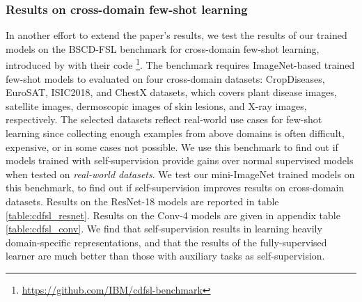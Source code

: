 


\subsubsection{Results on cross-domain few-shot learning}

In another effort to extend the paper's results, we test the results of our trained models on the BSCD-FSL benchmark for cross-domain few-shot learning, introduced by \cite{guo2020broader} with their code \footnote[7]{\url{https://github.com/IBM/cdfsl-benchmark}}. The benchmark requires ImageNet-based trained few-shot models to evaluated on four cross-domain datasets: CropDiseases, EuroSAT, ISIC2018, and ChestX datasets, which covers plant disease images, satellite images, dermoscopic images of skin lesions, and X-ray images, respectively. The selected datasets reflect real-world use cases for few-shot learning since collecting enough examples from above domains is often difficult, expensive, or in some cases not possible. We use this benchmark to find out if models trained with self-supervision provide gains over normal supervised models when tested  on \textit{real-world datasets}. We test our mini-ImageNet trained models on this benchmark, to find out if self-supervision improves results on cross-domain datasets. Results on the ResNet-18 models are reported in table \ref{table:cdfsl_resnet}. Results on the Conv-4 models are given in appendix table \ref{table:cdfsl_conv}. 
We find that self-supervision results in learning heavily domain-specific representations, and that the results of the fully-supervised learner are much better than those with auxiliary tasks as self-supervision.


